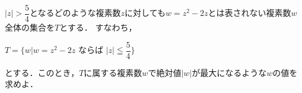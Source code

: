 \documentclass[../../main.tex]{subfiles}
\begin{document}
$\displaystyle |z|>\dfrac{5}{4}$となるどのような複素数$z$に対しても$w=z^2-2z$とは表されない複素数$w$全体の集合を$T$とする．
すなわち，

\begin{center}
  $T = \bigg\{ w \bigg| w=z^2-2z$ ならば $\displaystyle |z| \leqq \dfrac{5}{4} \bigg\}$
\end{center}

とする．このとき，$T$に属する複素数$w$で絶対値$|w|$が最大になるような$w$の値を求めよ．
\end{document}
